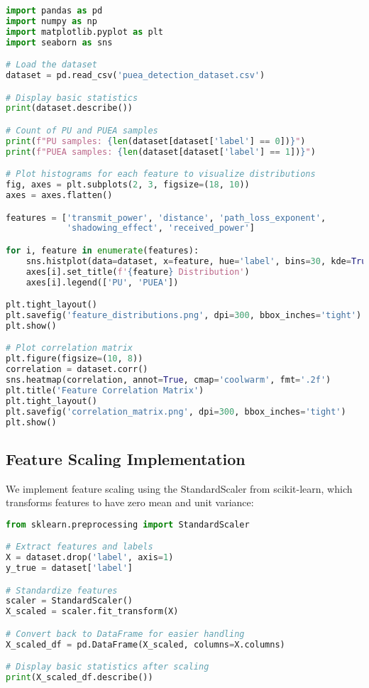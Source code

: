 \begin{lstlisting}[language=Python, caption=Data Exploration Code]
import pandas as pd
import numpy as np
import matplotlib.pyplot as plt
import seaborn as sns

# Load the dataset
dataset = pd.read_csv('puea_detection_dataset.csv')

# Display basic statistics
print(dataset.describe())

# Count of PU and PUEA samples
print(f"PU samples: {len(dataset[dataset['label'] == 0])}")
print(f"PUEA samples: {len(dataset[dataset['label'] == 1])}")

# Plot histograms for each feature to visualize distributions
fig, axes = plt.subplots(2, 3, figsize=(18, 10))
axes = axes.flatten()

features = ['transmit_power', 'distance', 'path_loss_exponent', 
            'shadowing_effect', 'received_power']

for i, feature in enumerate(features):
    sns.histplot(data=dataset, x=feature, hue='label', bins=30, kde=True, ax=axes[i])
    axes[i].set_title(f'{feature} Distribution')
    axes[i].legend(['PU', 'PUEA'])

plt.tight_layout()
plt.savefig('feature_distributions.png', dpi=300, bbox_inches='tight')
plt.show()

# Plot correlation matrix
plt.figure(figsize=(10, 8))
correlation = dataset.corr()
sns.heatmap(correlation, annot=True, cmap='coolwarm', fmt='.2f')
plt.title('Feature Correlation Matrix')
plt.tight_layout()
plt.savefig('correlation_matrix.png', dpi=300, bbox_inches='tight')
plt.show()
\end{lstlisting}

\subsection{Feature Scaling Implementation}
We implement feature scaling using the StandardScaler from scikit-learn, which transforms features to have zero mean and unit variance:

\begin{lstlisting}[language=Python, caption=Feature Scaling Implementation]
from sklearn.preprocessing import StandardScaler

# Extract features and labels
X = dataset.drop('label', axis=1)
y_true = dataset['label']

# Standardize features
scaler = StandardScaler()
X_scaled = scaler.fit_transform(X)

# Convert back to DataFrame for easier handling
X_scaled_df = pd.DataFrame(X_scaled, columns=X.columns)

# Display basic statistics after scaling
print(X_scaled_df.describe())
\end{lstlisting}

